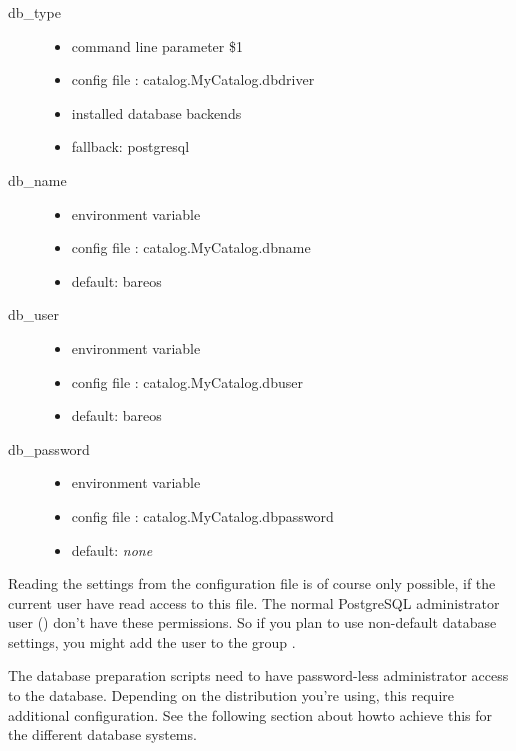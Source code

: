 \begin{description}
    \item[db\_type] \hfill
        \begin{itemize}
            \item command line parameter \$1
            \item config file \configFileDirUnix: catalog.MyCatalog.dbdriver
            \item installed database backends
            \item fallback: postgresql
        \end{itemize}
    \item[db\_name] \hfill
        \begin{itemize}
            \item environment variable 
            \item config file \configFileDirUnix: catalog.MyCatalog.dbname
            \item default: bareos
        \end{itemize}
    \item[db\_user] \hfill
        \begin{itemize}
            \item environment variable 
            \item config file \configFileDirUnix: catalog.MyCatalog.dbuser
            \item default: bareos
        \end{itemize}
    \item[db\_password] \hfill
        \begin{itemize}
            \item environment variable 
            \item config file \configFileDirUnix: catalog.MyCatalog.dbpassword
            \item default: \textit{none}
        \end{itemize}
\end{description}

Reading the settings from the configuration file \configFileDirUnix is of course only possible,
if the current user have read access to this file.
The normal PostgreSQL administrator user () don't have these permissions.
So if you plan to use non-default database settings, you might add the user  to the group .

The database preparation scripts need to have password-less administrator access to the database.
Depending on the distribution you're using, this require additional configuration.
See the following section about howto achieve this for the different database systems.


